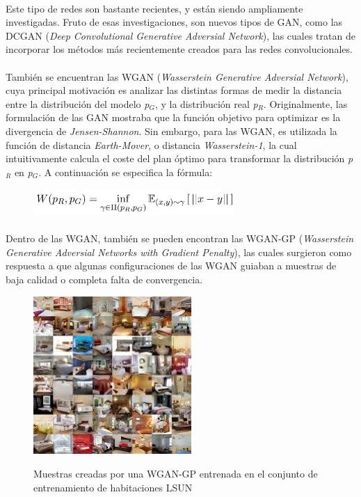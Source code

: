 \documentclass[12pt]{article}
\begin{document}
	\paragraph{}
	Este tipo de redes son bastante recientes, y están siendo ampliamente investigadas. Fruto de esas investigaciones, son nuevos tipos de GAN, como las DCGAN (\textit{Deep Convolutional Generative Adversial Network}), las cuales tratan de incorporar los métodos más recientemente creados para las redes convolucionales. 
	
	\paragraph{}
	También se encuentran las WGAN (\textit{Wasserstein Generative Adversial Network}), cuya principal motivación es analizar las distintas formas de medir la distancia entre la distribución del modelo \textit{p$_{G}$}, y la distribución real \textit{p$_{R}$}. Originalmente, las formulación de las GAN mostraba que la función objetivo para optimizar es la divergencia de \textit{Jensen-Shannon}. Sin embargo, para las WGAN, es utilizada la función de distancia \textit{Earth-Mover}, o distancia \textit{Wasserstein-1}, la cual intuitivamente calcula el coste del plan óptimo para transformar la distribución \textit{p$_{R}$} en \textit{p$_{G}$}. A continuación se especifica la fórmula:
	
	\begin{figure}[H]
	 	\centering
		\includegraphics[height=1cm]{wasserstein.png}
		\label{fig:wasserstein}
	\end{figure}	
	
	\paragraph{}
	Dentro de las WGAN, también se pueden encontran las WGAN-GP (\textit{Wasserstein Generative Adversial Networks with Gradient Penalty}), las cuales surgieron como respuesta a que algunas configuraciones de las WGAN guiaban a muestras de baja calidad o completa falta de convergencia.
	
	\begin{figure}[H]
		\centering
		\includegraphics[width=6cm]{lsun.jpg}
		\label{fig:lsun_bedroom}
		\caption{Muestras creadas por una WGAN-GP entrenada en el conjunto de entrenamiento de habitaciones LSUN}
	\end{figure}	
	\newpage
	
\end{document}

